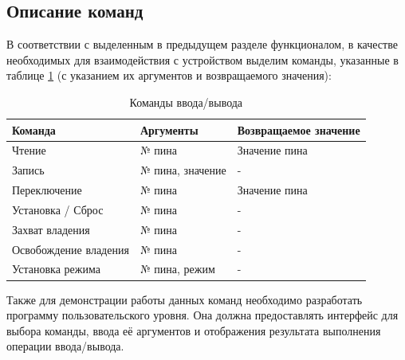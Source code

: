 \subsection{Описание команд}
В соответствии с выделенным в предыдущем разделе функционалом, в качестве необходимых для взаимодействия с устройством выделим команды, указанные в таблице \ref{tab:commands} (с указанием их аргументов и возвращаемого значения):
\begin{table}[h] 
	\caption{Команды ввода/вывода}
	\label{tab:commands}
	\begin{tabular}{| X | X | X |}
		\hline
		
		\textbf{Команда} &
		\textbf{Аргументы} &
		\textbf{Возвращаемое значение} \\ \hline
		
		Чтение	&	
		№ пина  &
		Значение пина \\ \hline
		
		Запись	&	
		№ пина, значение  &
		- \\ \hline
		
		Переключение &	
		№ пина  &
		Значение пина \\ \hline
		
		Установка / Сброс &	
		№ пина  &
		- \\ \hline
		
		Захват владения &	
		№ пина  &
		- \\ \hline
		
		Освобождение владения &	
		№ пина  &
		- \\ \hline
		
		Установка режима &	
		№ пина, режим  &
		- \\ \hline
	\end{tabular}
\end{table}

Также для демонстрации работы данных команд необходимо разработать программу пользовательского уровня. Она должна предоставлять интерфейс для выбора команды, ввода её аргументов и отображения результата выполнения операции ввода/вывода.

\pagebreak
